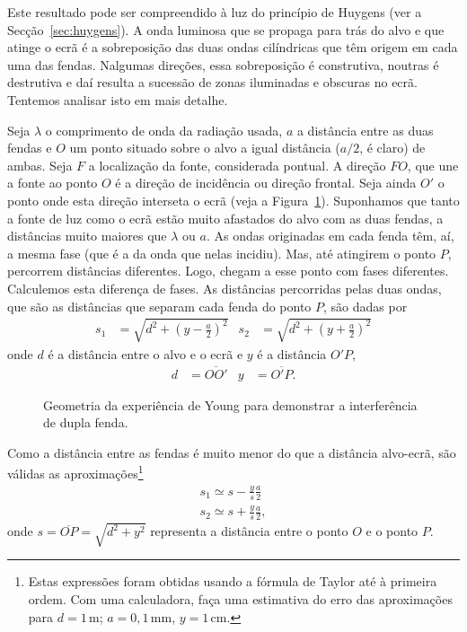 Este resultado pode ser compreendido à luz do princípio de Huygens (ver a
Secção~\ref{sec:huygens}). A onda luminosa que se propaga para trás do alvo e que
atinge o ecrã é a sobreposição das duas ondas cilíndricas que têm origem em cada
uma das fendas. Nalgumas direções, essa sobreposição é construtiva, noutras é
destrutiva e daí resulta a sucessão de zonas iluminadas e obscuras no ecrã.
Tentemos analisar isto em mais detalhe.

Seja $\lambda$ o comprimento de onda da radiação usada, $a$ a distância entre
as duas fendas e $O$ um ponto situado sobre o alvo a igual distância ($a/2$, é
claro) de ambas. Seja $F$ a localização da fonte, considerada pontual. A direção
$FO$, que une a fonte ao ponto $O$ é a direção de incidência ou direção frontal.
Seja ainda $O'$ o ponto onde esta direção interseta o ecrã (veja a
Figura~\ref{fig:40-040}). Suponhamos que tanto a fonte de luz como o ecrã estão
muito afastados do alvo com as duas fendas, a distâncias muito maiores que
$\lambda$ ou $a$. As ondas originadas em cada fenda têm, aí, a mesma
fase (que é a da onda que nelas incidiu). Mas, até atingirem o ponto $P$,
percorrem distâncias diferentes. Logo, chegam a esse ponto com fases diferentes.
Calculemos esta diferença de fases. As distâncias percorridas pelas duas ondas,
que são as distâncias que separam cada fenda do ponto $P$, são dadas por
\begin{align*}
    s_1&=\sqrt{d^2+\left(y-\frac{a}{2}\right)^2}&
    s_2&=\sqrt{d^2+\left(y+\frac{a}{2}\right)^2}
\end{align*}
onde $d$ é a distância entre o alvo e o ecrã e $y$ é a distância $O'P$,
\begin{align*}
d&=\overline{OO'}&y&=\overline{O'P}.%
\end{align*}
\begin{figure}[htb]
    {\centering
        
        \caption{Geometria da experiência de Young para demonstrar a
        interferência de dupla fenda.\label{fig:40-040}}

    }
\end{figure}
Como a distância entre as fendas é muito menor do que a distância alvo-ecrã,
são válidas as aproximações\footnote{Estas expressões foram obtidas usando a
fórmula de Taylor até à primeira ordem. Com uma calculadora, faça uma estimativa
do erro das aproximações para $d=1$\,m; $a=0,1$\,mm, $y=1$\,cm.}
\begin{align*}
s_1\simeq s-\frac{y}{s}\frac{a}{2}\\
s_2\simeq s+\frac{y}{s}\frac{a}{2},
\end{align*}
onde $s=\overline{OP}=\sqrt{d^2+y^2}$ representa a distância entre o ponto $O$ e
o ponto $P$.

